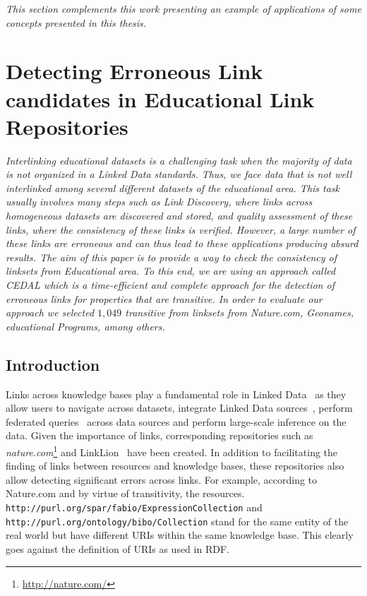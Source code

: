 \textit{This section complements this work presenting an example of applications of some concepts presented in this thesis.}

\section{Detecting Erroneous Link candidates in Educational Link Repositories}

\textit{Interlinking educational datasets is a challenging task when the majority of data is not organized in a Linked Data standards. Thus, we face data that is not well interlinked among several different datasets of the educational area. This task usually involves many steps such as Link Discovery, where links across homogeneous datasets are discovered and stored, and quality assessment of these links, where the consistency of these links is verified. 
    However, a large number of these links are erroneous and can thus lead to these applications producing absurd results.
    The aim of this paper is to provide a way to check the consistency of linksets from Educational area. To this end, we are using an approach called CEDAL which is a time-efficient and complete approach for the detection of erroneous links for properties that are transitive.
    In order to evaluate our approach we selected $1,049$ transitive from linksets from Nature.com, Geonames, educational Programs, among others.}

\subsection{Introduction}
Links across knowledge bases play a fundamental role in Linked Data~\cite{Albertoni:2013:ALQ:2457317.2457327} as they  allow users to navigate across datasets, integrate Linked Data sources~\cite{NgomoSL14}, perform federated queries~\cite{saleem2013daw} across data sources and perform large-scale inference on the data.
Given the importance of links, corresponding repositories such as \emph{nature.com}\footnote{\url{http://nature.com/}} and LinkLion~\cite{nentwig2014linklion} have been created. 
In addition to facilitating the finding of links between  resources and knowledge bases, these repositories also allow detecting significant errors across links. 
For example, according to Nature.com and by virtue of transitivity, the resources. \texttt{http://purl.org/spar/fabio/ExpressionCollection} and \texttt{http://purl.org/ontology/bibo/Collection} stand for the same entity of the real world but have different URIs within the same knowledge base. 
This clearly goes against the definition of URIs as used in RDF.

